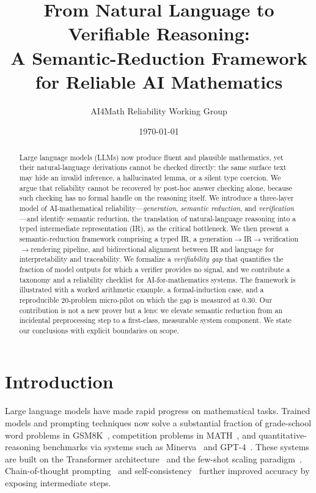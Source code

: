 \documentclass[11pt]{article}
\title{\bfseries From Natural Language to Verifiable Reasoning:\\[0.3em]
       A Semantic-Reduction Framework for Reliable AI Mathematics}
\author{AI4Math Reliability Working Group}
\date{\today}
\theoremstyle{definition}
\theoremstyle{plain}
\theoremstyle{remark}
\begin{document}
\maketitle

\begin{abstract}
Large language models (LLMs) now produce fluent and plausible mathematics, yet their
natural-language derivations cannot be checked directly: the same surface text may hide an
invalid inference, a hallucinated lemma, or a silent type coercion. We argue that reliability
cannot be recovered by post-hoc answer checking alone, because such checking has no formal
handle on the reasoning itself. We introduce a three-layer model of AI-mathematical
reliability---\emph{generation}, \emph{semantic reduction}, and \emph{verification}---and
identify semantic reduction, the translation of natural-language reasoning into a typed
intermediate representation (IR), as the critical bottleneck. We then present a
semantic-reduction framework comprising a typed IR, a
generation$\to$IR$\to$verification$\to$rendering pipeline, and bidirectional alignment
between IR and language for interpretability and traceability. We formalize a
\emph{verifiability gap} that quantifies the fraction of model outputs for which a verifier
provides no signal, and we contribute a taxonomy and a reliability checklist for
AI-for-mathematics systems. The framework is illustrated with a worked arithmetic example,
a formal-induction case, and a reproducible 20-problem micro-pilot on which the gap is
measured at $0.30$. Our contribution is not a new prover but a lens: we elevate
semantic reduction from an incidental preprocessing step to a first-class, measurable system
component. We state our conclusions with explicit boundaries on scope.
\end{abstract}

\section{Introduction}
Large language models have made rapid progress on mathematical tasks. Trained models and
prompting techniques now solve a substantial fraction of grade-school word problems in
GSM8K~\cite{cobbe2021}, competition problems in MATH~\cite{hendrycks2021}, and
quantitative-reasoning benchmarks via systems such as Minerva~\cite{lewkowycz2022} and
GPT-4~\cite{achiam2023}. These systems are built on the Transformer architecture~\cite{vaswani2017} and
the few-shot scaling paradigm~\cite{brown2020}. Chain-of-thought prompting~\cite{wei2022} and
self-consistency~\cite{wang2023selfconsistency} further improved accuracy by exposing
intermediate steps.
\end{document}
